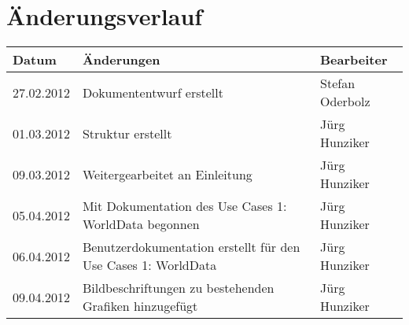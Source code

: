 \section*{Änderungsverlauf}

\begin{longtable}{|p{2cm}|p{10cm}|p{3cm}|}
\hline 
\textbf{Datum} & \textbf{Änderungen} & \textbf{Bearbeiter} \\ 
\hline 
27.02.2012 & Dokumententwurf erstellt & Stefan Oderbolz \\ 
\hline 
01.03.2012 & Struktur erstellt & Jürg Hunziker \\ 
\hline 
09.03.2012 & Weitergearbeitet an Einleitung & Jürg Hunziker \\ 
\hline 
05.04.2012 & Mit Dokumentation des Use Cases 1: WorldData begonnen & Jürg Hunziker \\ 
\hline 
06.04.2012 & Benutzerdokumentation erstellt für den Use Cases 1: WorldData & Jürg Hunziker \\ 
\hline 
09.04.2012 & Bildbeschriftungen zu bestehenden Grafiken hinzugefügt & Jürg Hunziker \\ 
\hline 
\end{longtable} 
